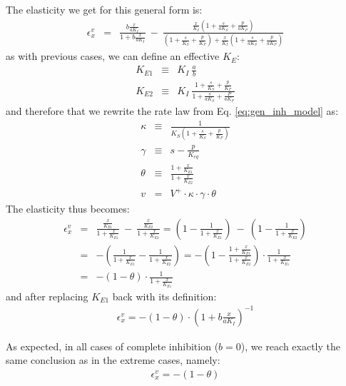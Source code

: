 \documentclass[12pt,a4paper]{article}
\begin{document}
The elasticity we get for this general form is:
\begin{eqnarray}
\epsilon_x^v &=& \frac{b \frac{x}{aK_I}}{1 + b \frac{x}{aK_I}} ~-~ \frac{\frac{x}{K_I} \left(1 + \frac{s}{aK_S} + \frac{p}{aK_P}\right)}{\left(1 + \frac{s}{K_S} + \frac{p}{K_P}\right) + \frac{x}{K_I} \left(1 + \frac{s}{aK_S} + \frac{p}{aK_P}\right)}
\end{eqnarray}
as with previous cases, we can define an effective $K_E$:
\begin{eqnarray}
    K_{E1} & \equiv & K_I ~ \frac{a}{b} \\
    K_{E2} & \equiv & K_I ~ \frac{1 + \frac{s}{K_S} + \frac{p}{K_P}}{1 + \frac{s}{aK_S} + \frac{P}{aK_P}}
\end{eqnarray}
and therefore that we rewrite the rate law from Eq. \ref{eq:gen_inh_model} as:
\begin{eqnarray}
\kappa &\equiv& \frac{1}{K_S \left(1 + \frac{s}{K_S} + \frac{p}{K_P}\right)} \nonumber \\
\gamma &\equiv& s - \frac{p}{K_{eq}} \nonumber \\
\theta &\equiv& \frac{1 + \frac{x}{K_{E1}}}{1 + \frac{x}{K_{E2}}} \nonumber \\
v &=& V^+ \cdot \kappa \cdot \gamma \cdot \theta
\end{eqnarray}
The elasticity thus becomes:
\begin{eqnarray}
\epsilon_x^v &=& 
	\frac{\frac{x}{K_{E1}}}{1 + \frac{x}{K_{E1}}} ~-~ \frac{\frac{x}{K_{E2}}}{1 + \frac{x}{K_{E2}}} = 
	\left( 1 - \frac{1}{1 + \frac{x}{K_{E1}}} \right) ~-~ \left(1 - \frac{1}{1 + \frac{x}{K_{E2}}} \right) \nonumber\\
	&=& -\left(\frac{1}{1 + \frac{x}{K_{E1}}} -  \frac{1}{1 + \frac{x}{K_{E2}}} \right) = 
	-\left( 1 -  \frac{1 + \frac{x}{K_{E1}}}{1 + \frac{x}{K_{E2}}} \right) \cdot \frac{1}{1 + \frac{x}{K_{E1}}} \nonumber\\
	&=& -(1 - \theta) \cdot  \frac{1}{1 + \frac{x}{K_{E1}}}
\end{eqnarray}
and after replacing $K_{E1}$ back with its definition:
\begin{eqnarray}
	\epsilon_x^v = -\left(1 - \theta\right) \cdot  \left( 1 + b \frac{x}{aK_I} \right)^{-1}
\end{eqnarray}

As expected, in all cases of complete inhibition ($b = 0$), we reach exactly the same conclusion as in the extreme cases, namely:
\begin{eqnarray}
\epsilon_x^v = -(1 - \theta) \label{eq:eps_general_inh}
\end{eqnarray}
\end{document}
